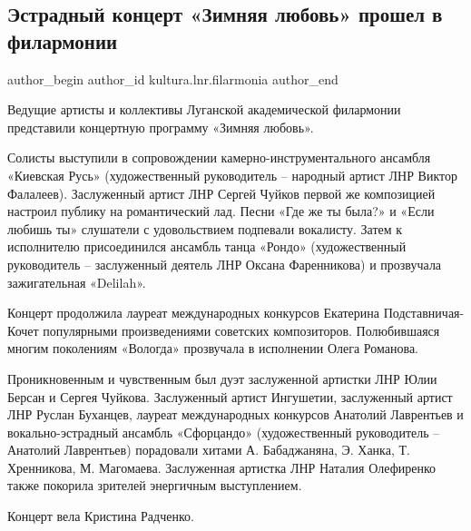  
 
 
 
 
\subsection{Эстрадный концерт «Зимняя любовь» прошел в филармонии}
\label{sec:16_01_2022.stz.kultura.lnr.filarmonia.1.koncert_zimnjaja_ljubov}
 
\ifcmt
 author_begin
   author_id kultura.lnr.filarmonia
 author_end
\fi

\begin{zznagolos}
Ведущие артисты и коллективы Луганской академической филармонии представили
концертную программу «Зимняя любовь».
\end{zznagolos}

Солисты выступили в сопровождении камерно-инструментального ансамбля «Киевская
Русь» (художественный руководитель – народный артист ЛНР Виктор Фалалеев).
Заслуженный артист ЛНР Сергей Чуйков первой же композицией настроил публику на
романтический лад. Песни «Где же ты была?» и «Если любишь ты» слушатели с
удовольствием подпевали вокалисту. Затем к исполнителю присоединился ансамбль
танца «Рондо» (художественный руководитель – заслуженный деятель ЛНР Оксана
Фаренникова) и прозвучала зажигательная «Delilah».  


Концерт продолжила лауреат международных конкурсов Екатерина Подставничая-Кочет
популярными произведениями советских композиторов. Полюбившаяся многим
поколениям «Вологда» прозвучала в исполнении Олега Романова.  


Проникновенным и чувственным был дуэт заслуженной артистки ЛНР Юлии Берсан и
Сергея Чуйкова. Заслуженный артист Ингушетии, заслуженный артист ЛНР Руслан
Буханцев, лауреат международных конкурсов Анатолий Лаврентьев и
вокально-эстрадный ансамбль «Сфорцандо» (художественный руководитель – Анатолий
Лаврентьев) порадовали хитами А. Бабаджаняна, Э. Ханка, Т. Хренникова, М.
Магомаева. Заслуженная артистка ЛНР Наталия Олефиренко также покорила зрителей
энергичным выступлением.

Концерт вела Кристина Радченко.

